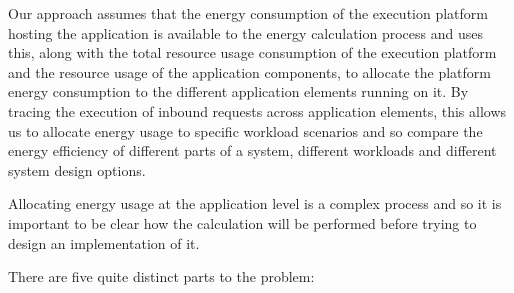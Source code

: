 Our approach assumes that the energy consumption of the execution platform hosting the application is available to the energy calculation process and uses this, along with the total resource usage consumption of the execution platform and the resource usage of the application components, to allocate the platform energy consumption to the different application elements running on it.  By tracing the execution of inbound requests across application elements, this allows us to allocate energy usage to specific workload scenarios and so compare the energy efficiency of different parts of a system, different workloads and different system design options.

Allocating energy usage at the application level is a complex process and so it is important to be clear how the calculation will be performed before trying to design an implementation of it.

There are five quite distinct parts to the problem:

